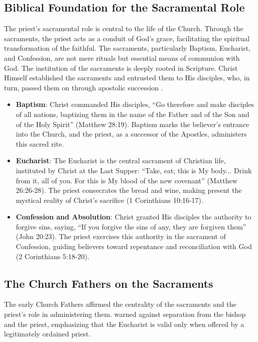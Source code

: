 \documentclass[12pt,doc]{apa7}   	%
\begin{document}
\subsection{Biblical Foundation for the Sacramental Role}

The priest’s sacramental role is central to the life of the Church. Through the sacraments, the priest acts as a conduit of God’s grace, facilitating the spiritual transformation of the faithful. The sacraments, particularly Baptism, Eucharist, and Confession, are not mere rituals but essential means of communion with God. The institution of the sacraments is deeply rooted in Scripture. Christ Himself established the sacraments and entrusted them to His disciples, who, in turn, passed them on through apostolic succession \citep{holmes_apostolic_fathers}. 

\begin{itemize}
    \item \textbf{Baptism}: Christ commanded His disciples, ``Go therefore and make disciples of all nations, baptizing them in the name of the Father and of the Son and of the Holy Spirit'' (Matthew 28:19). Baptism marks the believer’s entrance into the Church, and the priest, as a successor of the Apostles, administers this sacred rite.
    
    \item \textbf{Eucharist}: The Eucharist is the central sacrament of Christian life, instituted by Christ at the Last Supper: ``Take, eat; this is My body... Drink from it, all of you. For this is My blood of the new covenant'' (Matthew 26:26-28). The priest consecrates the bread and wine, making present the mystical reality of Christ’s sacrifice (1 Corinthians 10:16-17).

    \item \textbf{Confession and Absolution}: Christ granted His disciples the authority to forgive sins, saying, ``If you forgive the sins of any, they are forgiven them'' (John 20:23). The priest exercises this authority in the sacrament of Confession, guiding believers toward repentance and reconciliation with God (2 Corinthians 5:18-20).
\end{itemize}

\subsection{The Church Fathers on the Sacraments}

The early Church Fathers affirmed the centrality of the sacraments and the priest’s role in administering them. \cite{epistles_ignatius} warned against separation from the bishop and the priest, emphasizing that the Eucharist is valid only when offered by a legitimately ordained priest. 
\end{document}
